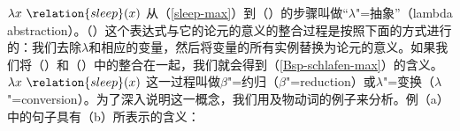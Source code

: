 \ea
$\lambda x~\relation{sleep}(x)$
\z
%
从（\ref{sleep-max}）到（）的步骤叫做“$\lambda$"=抽象”（lambda abstraction）。（）这个表达式与它的论元的意义的整合过程是按照下面的方式进行的：我们去除$\lambda$和相应的变量，然后将变量的所有实例替换为论元的意义。如果我们将（）和（）中的整合在一起，我们就会得到（\ref{Bsp-schlafen-max}）的含义。
\ea
$\lambda x~\relation{sleep}(x)$ 
\z
这一过程叫做$\beta$"=约归（$\beta$"=reduction）或$\lambda$"=变换（$\lambda$"=conversion）。为了深入说明这一概念，我们用及物动词的例子来分析。例（a）中的句子具有（b）所表示的含义：
\eal
\ex\label{Bsp-Max-mag-Lotte} 
